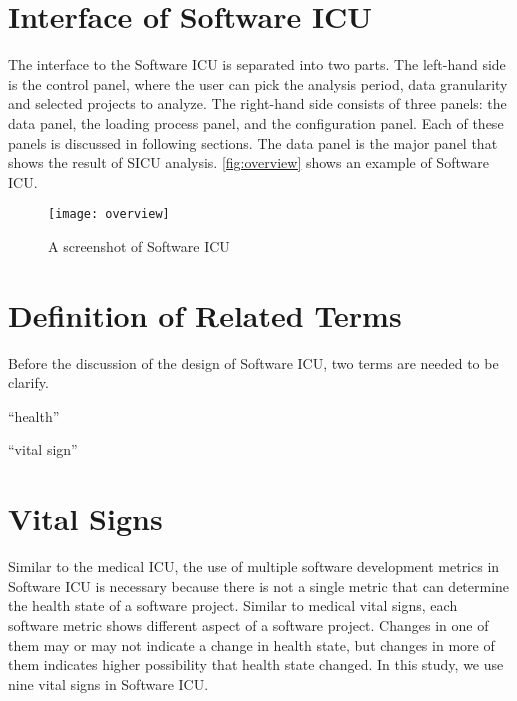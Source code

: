 \section{Interface of Software ICU}

The interface to the Software ICU is separated into two parts. The left-hand side is the control panel, where the user can pick the analysis period, data granularity and selected projects to analyze. The right-hand side consists of three panels: the data panel, the loading process panel, and the configuration panel. Each of these panels is discussed in following sections. The data panel is the major panel that shows the result of SICU analysis. \autoref{fig:overview} shows an example of Software ICU.

\begin{figure}[htbp]
   \centering
   \texttt{[image: overview]}
   \caption{A screenshot of Software ICU}
   \label{fig:overview}
\end{figure}

\section {Definition of Related Terms}
Before the discussion of the design of Software ICU, two terms are needed to be clarify. 

``health''

``vital sign''

\section{Vital Signs}
\label{vitalSign}

Similar to the medical ICU, the use of multiple software development metrics in Software ICU is necessary because there is not a single metric that can determine the health state of a software project. Similar to medical vital signs, each software metric shows different aspect of a software project. Changes in one of them may or may not indicate a change in health state, but changes in more of them indicates higher possibility that health state changed. In this study, we use nine vital signs in Software ICU.

